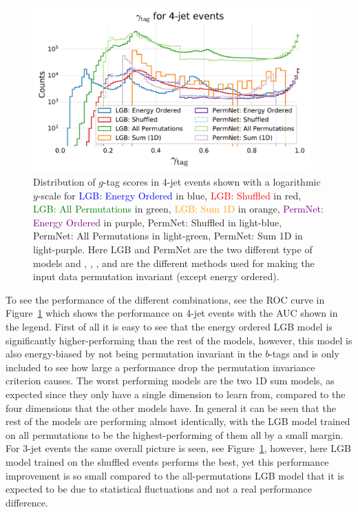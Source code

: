 \begin{figure}[h!]
  \centerfloat
  \includegraphics[width=0.95\textwidth, trim=10 10 10 45, clip]{figures/quarks/gtag_y_pred_4_jet_hist-down_sample=1.00-ML_vars=vertex-selection=b-ejet_min=4-n_iter_RS_lgb=99-n_iter_RS_xgb=9-cdot_cut=0.90-version=19.pdf}
  \caption[$g$-Tag Scores in 4-Jet Events]
          {Distribution of $g$-tag scores in 4-jet events shown with a logarithmic $y$-scale for \textcolor{blue}{LGB: Energy Ordered} in blue, \textcolor{red}{LGB: Shuffled} in red, \textcolor{green}{LGB: All Permutations} in green, \textcolor{orange}{LGB: Sum 1D} in orange, \textcolor{purple}{PermNet: Energy Ordered} in purple, \textcolor{light-blue}{PermNet: Shuffled} in light-blue, \textcolor{light-green}{PermNet: All Permutations} in light-green, \textcolor{light-purple}{PermNet: Sum 1D} in light-purple.  Here LGB and PermNet are the two different type of models and , , , and  are the different methods used for making the input data permutation invariant (except energy ordered).}   
  \label{fig:q:gtag_scores_4j}
\end{figure}

To see the performance of the different combinations, see the ROC curve in Figure~\ref{fig:q:gtag_scores_4j} which shows the performance on 4-jet events with the AUC shown in the legend. First of all it is easy to see that the energy ordered LGB model is significantly higher-performing than the rest of the models, however, this model is also energy-biased by not being permutation invariant in the $b$-tags and is only included to see how large a performance drop the permutation invariance criterion causes. The worst performing models are the two 1D sum models, as expected since they only have a single dimension to learn from, compared to the four dimensions that the other models have. In general it can be seen that the rest of the models are performing almost identically, with the LGB model trained on all permutations to be the highest-performing of them all by a small margin. 
For 3-jet events the same overall picture is seen, see Figure~\ref{fig:q:gtag_scores_4j}, however, here LGB model trained on the shuffled events performs the best, yet this performance improvement is so small compared to the all-permutations LGB model that it is expected to be due to statistical fluctuations and not a real performance difference. 

